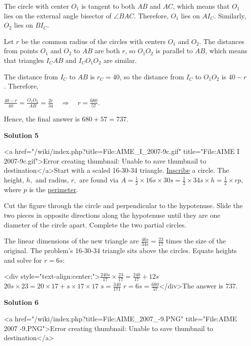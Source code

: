 \begin{enumerate}
 The circle with center $O_{1}$ is tangent to both $AB$ and $AC$, which means that $O_{1}$ lies on the external angle bisector of $\angle BAC$.  Therefore, $O_{1}$ lies on $AI_{C}$.  Similarly, $O_{2}$ lies on $BI_{C}$.

 Let $r$ be the common radius of the circles with centers $O_{1}$ and $O_{2}$.  The distances from points $O_{1}$ and $O_{2}$ to $AB$ are both $r$, so $O_{1}O_{2}$ is parallel to $AB$, which means that triangles $I_{C}AB$ and $I_{C}O_{1}O_{2}$ are similar.

 The distance from $I_{C}$ to $AB$ is $r_{C}= 40$, so the distance from $I_{C}$ to $O_{1}O_{2}$ is $40-r$.  Therefore,

 $\frac{40-r}{40}= \frac{O_{1}O_{2}}{AB}= \frac{2r}{34}\quad \Rightarrow \quad r = \frac{680}{57}$.

 Hence, the final answer is $680+57 = 737$.

 



\textbf{Solution 5}

<a href="/wiki/index.php?title=File:AIME\_I\_2007-9c.gif" title="File:AIME I 2007-9c.gif">Error creating thumbnail: Unable to save thumbnail to destination</a>Start with a scaled 16-30-34 triangle. \href{https://artofproblemsolving.com/wiki/index.php?title=Inscribe}{Inscribe} a circle.  The height, $h,$ and radius, $r,$ are found via $A=\frac{1}{2}\times 16s\times 30s=\frac{1}{2}\times 34s\times h=\frac{1}{2}\times rp,$ where $p$ is the \href{https://artofproblemsolving.com/wiki/index.php?title=Perimeter}{perimeter}.

 Cut the figure through the circle and perpendicular to the hypotenuse.  Slide the two pieces in opposite directions along the hypotenuse until they are one diameter of the circle apart.  Complete the two partial circles.

 The linear dimensions of the new triangle are $\frac{46s}{34s}=\frac{23}{17}$ times the size of the original.  The problem's 16-30-34 triangle sits above the circles.  Equate heights and solve for $r=6s$:

 <div style="text-align:center;">$\frac{240s}{17}\times\frac{23}{17} =  \frac{240}{17}+12s$
$20s\times 23 =  20\times 17+s\times 17\times 17$
$s = \frac{340}{171}$
$r = 6s = \frac{680}{57}$</div>The answer is $737$.

 



\textbf{Solution 6}

<a href="/wiki/index.php?title=File:AIME\_2007\_-9.PNG" title="File:AIME 2007 -9.PNG">Error creating thumbnail: Unable to save thumbnail to destination</a>


\end{enumerate}
